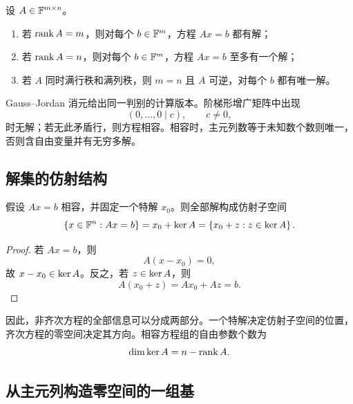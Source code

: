 \begin{corollary}
设 $A\in\mathbb F^{m\times n}$。
\begin{enumerate}
  \item 若 $\operatorname{rank} A=m$，则对每个 $b\in\mathbb F^m$，方程 $Ax=b$ 都有解；
  \item 若 $\operatorname{rank} A=n$，则对每个 $b\in\mathbb F^m$，方程 $Ax=b$ 至多有一个解；
  \item 若 $A$ 同时满行秩和满列秩，则 $m=n$ 且 $A$ 可逆，对每个 $b$ 都有唯一解。
\end{enumerate}
\end{corollary}

\begin{remark}
Gauss--Jordan 消元给出同一判别的计算版本。阶梯形增广矩阵中出现
\begin{equation}
 (0,\ldots,0\mid c),\qquad c\neq0,
\end{equation}
时无解；若无此矛盾行，则方程相容。相容时，主元列数等于未知数个数则唯一，否则含自由变量并有无穷多解。
\end{remark}

\subsection{解集的仿射结构}

\begin{theorem}
假设 $Ax=b$ 相容，并固定一个特解 $x_0$。则全部解构成仿射子空间
\begin{equation}
 \left\{x\in\mathbb F^n:Ax=b\right\}=x_0+\operatorname{ker} A
 =\left\{x_0+z:z\in\operatorname{ker} A\right\}.
\end{equation}
\end{theorem}

\begin{proof}
若 $Ax=b$，则
\begin{equation}
 A(x-x_0)=0,
\end{equation}
故 $x-x_0\in\operatorname{ker} A$。反之，若 $z\in\operatorname{ker} A$，则
\begin{equation}
 A(x_0+z)=Ax_0+Az=b.
\end{equation}
\end{proof}

\begin{remark}
因此，非齐次方程的全部信息可以分成两部分。一个特解决定仿射子空间的位置，齐次方程的零空间决定其方向。相容方程组的自由参数个数为
\begin{equation}
 \dim\operatorname{ker} A=n-\operatorname{rank} A.
\end{equation}
\end{remark}

\subsection{从主元列构造零空间的一组基}

